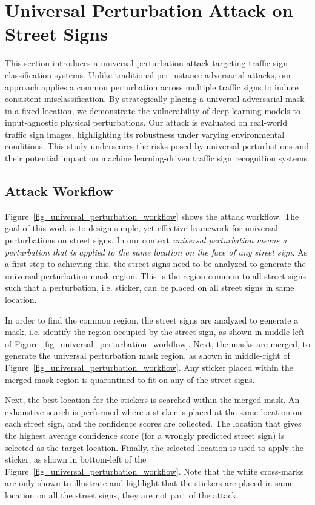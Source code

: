 \section{Universal Perturbation Attack on Street Signs}

This section introduces a universal perturbation attack targeting traffic sign classification systems. Unlike traditional per-instance adversarial attacks, our approach applies a common perturbation across multiple traffic signs to induce consistent misclassification. By strategically placing a universal adversarial mask in a fixed location, we demonstrate the vulnerability of deep learning models to input-agnostic physical perturbations. Our attack is evaluated on real-world traffic sign images, highlighting its robustness under varying environmental conditions. This study underscores the risks posed by universal perturbations and their potential impact on machine learning-driven traffic sign recognition systems.

\subsection{Attack Workflow}

Figure~\ref{fig_universal_perturbation_workflow} shows the attack workflow. The goal of this work is to design simple, yet effective framework for universal perturbations on street signs. In our context {\em universal perturbation means a perturbation that is applied to the same location on the face of any street sign.} As a first step to achieving this, the street signs need to be analyzed to generate the universal perturbation mask region. This is the region common to all street signs such that a perturbation, i.e. sticker, can be placed on all street signs in same location.

In order to find the common region, the street signs are analyzed to generate a mask, i.e. identify the region occupied by the street sign, as shown in middle-left of Figure~\ref{fig_universal_perturbation_workflow}. Next, the masks are merged, to generate the universal perturbation mask region, as shown in middle-right of Figure~\ref{fig_universal_perturbation_workflow}. Any sticker placed within the merged mask region is quarantined to fit on any of the street signs.

Next, the best location for the stickers is searched within the merged mask. An exhaustive search is performed where a sticker is placed at the same location on each street sign, and the confidence scores are collected. The location that gives the highest average confidence score (for a wrongly predicted street sign) is selected as the target location. Finally, the selected location is used to apply the sticker, as shown in bottom-left of the Figure~\ref{fig_universal_perturbation_workflow}. Note that the white cross-marks are only shown to illustrate and highlight that the stickers are placed in same location on all the street signs, they are not part of the attack.


